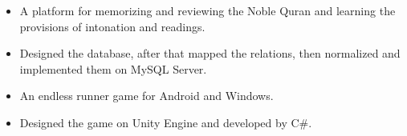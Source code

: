 \divider

\begin{itemize}
    \item A platform for memorizing and reviewing the Noble Quran and learning the provisions of intonation and readings.
    \item Designed the database, after that mapped the relations, then normalized and implemented them on MySQL Server.
\end{itemize}

\begin{itemize}
    \item An endless runner game for Android and Windows.
    \item Designed the game on Unity Engine and developed by C\#.
\end{itemize}